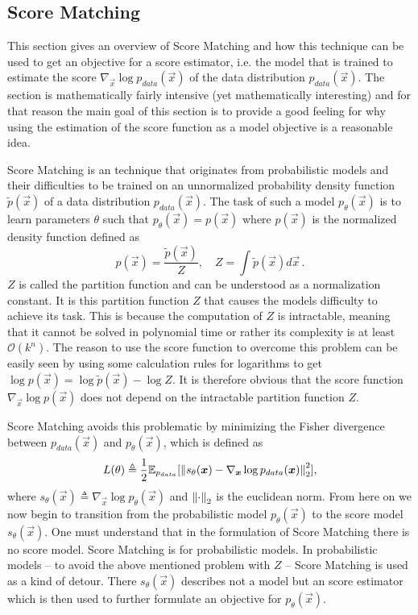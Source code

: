 \subsection{Score Matching} \label{sec:4.1.1}
This section gives an overview of Score Matching and how this technique can be used to get an objective for a score estimator, i.e. the model that is trained to estimate the score $\nabla_{\vec{x}}\log p_{data}(\vec{x})$ of the data distribution $p_{data}(\vec{x})$. The section is mathematically fairly intensive (yet mathematically interesting) and for that reason the main goal of this section is to provide a good feeling for why using the estimation of the score function as a model objective is a reasonable idea.

Score Matching \cite{score_matching_original} is an technique that originates from probabilistic models and their difficulties to be trained on an unnormalized probability density function $\tilde{p}(\vec{x})$ of a data distribution $p_{data}(\vec{x})$. The task of such a model $p_\theta(\vec{x})$ is to learn parameters $\theta$ such that $p_\theta(\vec{x})=p(\vec{x})$ where $p(\vec{x})$ is the normalized density function defined as
%
\begin{equation}
    p(\vec{x})=\frac{\tilde{p}(\vec{x})}{Z},\quad Z=\int\tilde{p}(\vec{x})d\vec{x}\,.
\end{equation}
%
$Z$ is called the partition function and can be understood as a normalization constant. It is this partition function $Z$ that causes the models difficulty to achieve its task. This is because the computation of $Z$ is intractable, meaning that it cannot be solved in polynomial time or rather its complexity is at least $\mathcal{O}(k^n)$. The reason to use the score function to overcome this problem can be easily seen by using some calculation rules for logarithms to get $\log p(\vec{x})=\log\tilde{p}(\vec{x})-\log Z$. It is therefore obvious that the score function $\nabla_{\vec{x}}\log p(\vec{x})$ does not depend on the intractable partition function $Z$.

Score Matching avoids this problematic by minimizing the Fisher divergence between $p_{data}(\vec{x})$ and $p_\theta(\vec{x})$, which is defined as
%
\begin{equation} \label{equ:4.2}
    L(\theta)\triangleq\frac{1}{2}\mathbb{E}_{p_{data}}[\left\lVert s_\theta(\boldsymbol{x})-\nabla_{\boldsymbol{x}}\log p_{data}(\boldsymbol{x})\right\rVert^2_2],
\end{equation}
%
where $s_\theta(\vec{x})\triangleq\nabla_{\vec{x}}\log p_\theta(\vec{x})$ and $\left\lVert\cdot\right\rVert_2$ is the euclidean norm. From here on we now begin to transition from the probabilistic model $p_\theta(\vec{x})$ to the score model $s_\theta(\vec{x})$. One must understand that in the formulation of Score Matching there is no score model. Score Matching is for probabilistic models. In probabilistic models – to avoid the above mentioned problem with $Z$ – Score Matching is used as a kind of detour. There $s_\theta(\vec{x})$ describes not a model but an score estimator which is then used to further formulate an objective for $p_\theta(\vec{x})$. 

